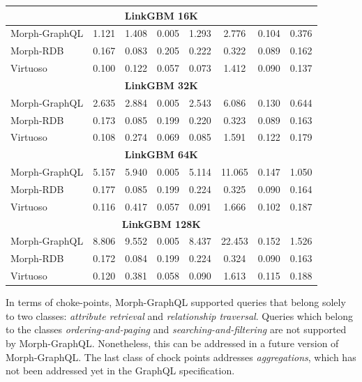 \begin{table}[]
{\begin{tabular}{l|c|c|c|c|c|c|c}
\multicolumn{8}{c}{\textbf{LinkGBM 16K}}                             \\ \hline
Morph-GraphQL & 1.121 & 1.408 & 0.005 & 1.293 & 2.776  & 0.104 & 0.376 \\ \hline
Morph-RDB     & 0.167 & 0.083 & 0.205 & 0.222 & 0.322  & 0.089 & 0.162 \\ \hline
Virtuoso      & 0.100 & 0.122 & 0.057 & 0.073 & 1.412  & 0.090 & 0.137 \\ \hline
\multicolumn{8}{c}{\textbf{LinkGBM 32K}}                             \\ \hline
Morph-GraphQL & 2.635 & 2.884 & 0.005 & 2.543 & 6.086  & 0.130 & 0.644 \\ \hline
Morph-RDB     & 0.173 & 0.085 & 0.199 & 0.220 & 0.323  & 0.089 & 0.163 \\ \hline
Virtuoso      & 0.108 & 0.274 & 0.069 & 0.085 & 1.591  & 0.122 & 0.179 \\ \hline
\multicolumn{8}{c}{\textbf{LinkGBM 64K}}                             \\ \hline
Morph-GraphQL & 5.157 & 5.940 & 0.005 & 5.114 & 11.065 & 0.147 & 1.050 \\ \hline
Morph-RDB     & 0.177 & 0.085 & 0.199 & 0.224 & 0.325  & 0.090 & 0.164 \\ \hline
Virtuoso      & 0.116 & 0.417 & 0.057 & 0.091 & 1.666  & 0.102 & 0.187 \\ \hline
\multicolumn{8}{c}{\textbf{LinkGBM 128K}}                            \\ \hline
Morph-GraphQL & 8.806 & 9.552 & 0.005 & 8.437 & 22.453 & 0.152 & 1.526 \\ \hline
Morph-RDB     & 0.172 & 0.084 & 0.199 & 0.224 & 0.324  & 0.090 & 0.163 \\ \hline
Virtuoso      & 0.120 & 0.381 & 0.058 & 0.090 & 1.613  & 0.115 & 0.188 \\ \hline
\end{tabular}%
}
\end{table}

In terms of choke-points, Morph-GraphQL supported queries that belong solely to two classes: \textit{attribute retrieval} and \textit{relationship traversal}. Queries which belong to the classes \textit{ordering-and-paging} and \textit{searching-and-filtering} are not supported by Morph-GraphQL. Nonetheless, this can be addressed in a future version of Morph-GraphQL. The last class of chock points addresses \textit{aggregations}, which has not been addressed yet in the GraphQL specification.


